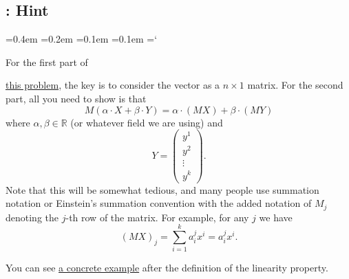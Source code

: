 
\subsection{\solutionSetsTitle: Hint}

{\ttfamily
{}\font=0.4em
\font=0.2em
\font=0.1em
\font=0.1em
\hyphenchar\font=`\-

\hypertarget{scripts_solution_sets_for_systems_of_linear_equations_hint}{For the first part of} \hyperref[matvect]{this problem}, the key is to consider the vector as a $n \times 1$ matrix. For the second part, all you need to show is that
\[
M(\alpha \cdot X + \beta \cdot Y) = \alpha \cdot (MX) + \beta \cdot (MY)
\]
where $\alpha, \beta \in \mathbb{R}$ (or whatever field we are using) and
\[
Y = \begin{pmatrix}y^1 \\ y^2 \\ \vdots \\ y^k\end{pmatrix}.
\]
Note that this will be somewhat tedious, and many people use summation notation or Einstein's summation convention with the added notation of $M_j$ denoting the $j$-th row of the matrix. For example, for any $j$ we have
\[
(MX)_j = \sum_{i=1}^k a_i^j x^i = a_i^j x^i.
\]

You can see \hyperlink{solution_sets_for_systems_of_linear_equations_concrete_example}{a concrete example} after the definition of the linearity property.

} %

\newpage
